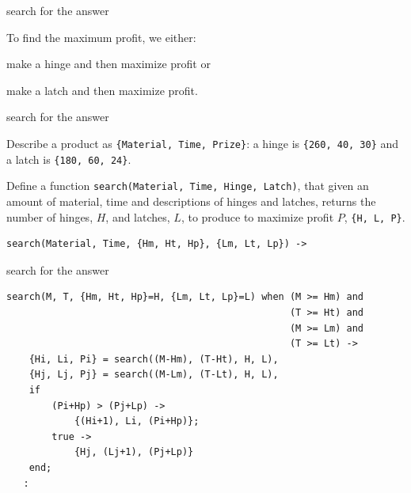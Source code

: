 \begin{frame}{search for the answer}

To find the maximum profit, we either:

\pause \vspace{20pt}\hspace{40pt}
   make a hinge and then maximize profit or

\pause \vspace{20pt}\hspace{40pt}
   make a latch and then maximize profit.

\pause \vspace{20pt}\hspace{40pt}


\end{frame}


\begin{frame}[fragile]{search for the answer}

Describe a product as {\tt \{Material, Time, Prize\}}: a hinge is {\tt \{260, 40, 30\}} and a latch is {\tt \{180, 60, 24\}}.

\pause\vspace{20pt}

Define a function {\tt search(Material, Time, Hinge, Latch)}, that
given an amount of material, time and descriptions of hinges and
latches, returns the number of hinges, $H$, and latches, $L$, to produce to
maximize profit $P$, {\tt \{H, L, P\}}.

\pause\vspace{20pt}

\begin{verbatim}
search(Material, Time, {Hm, Ht, Hp}, {Lm, Lt, Lp}) ->
\end{verbatim}
\end{frame}


\begin{frame}[fragile]{search for the answer}

\begin{verbatim}
search(M, T, {Hm, Ht, Hp}=H, {Lm, Lt, Lp}=L) when (M >= Hm) and 
                                                  (T >= Ht) and 
                                                  (M >= Lm) and 
                                                  (T >= Lt) ->
    {Hi, Li, Pi} = search((M-Hm), (T-Ht), H, L),
    {Hj, Lj, Pj} = search((M-Lm), (T-Lt), H, L), 
    if 
        (Pi+Hp) > (Pj+Lp) ->
            {(Hi+1), Li, (Pi+Hp)};
        true ->
            {Hj, (Lj+1), (Pj+Lp)}
    end;
   :
\end{verbatim}
\end{frame}

